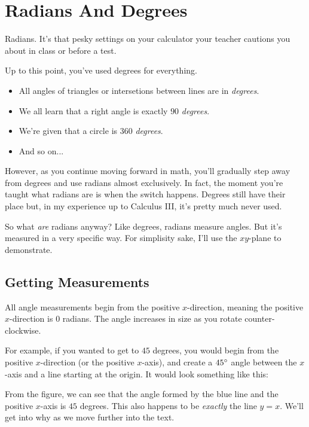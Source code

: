 \clearpage\chapter{Radians And Degrees}
Radians. It's that pesky settings on your calculator your teacher cautions you about in class or before a test.

Up to this point, you've used degrees for everything.
\begin{itemize}
    \item All angles of triangles or intersetions between lines are in \textit{degrees}.
    \item We all learn that a right angle is exactly $90$ \textit{degrees}.
    \item We're given that a circle is $360$ \textit{degrees}.
    \item And so on...
\end{itemize}
However, as you continue moving forward in math, you'll gradually step away from degrees and use radians almost exclusively. In fact, the moment you're taught what radians are is when the switch happens. Degrees still have their place but, in my experience up to Calculus III, it's pretty much never used.

So what \textit{are} radians anyway? Like degrees, radians measure angles. But it's measured in a very specific way. For simplisity sake, I'll use the $xy$-plane to demonstrate.
\clearpage
\section{Getting Measurements}
All angle measurements begin from the positive $x$-direction, meaning the positive $x$-direction is $0$ radians. The angle increases in size as you rotate counter-clockwise. 

For example, if you wanted to get to $45$ degrees, you would begin from the positive $x$-direction (or the positive $x$-axis), and create a $45\degree$ angle between the $x$-axis and a line starting at the origin. It would look something like this:

\begin{minipage}[c]{0.33\linewidth}
\end{minipage}
\begin{minipage}[c]{0.66\linewidth}
    From the figure, we can see that the angle formed by the blue line and the positive $x$-axis is $45$ degrees. This also happens to be \textit{exactly} the line $y = x$. We'll get into why as we move further into the text.
\end{minipage}

